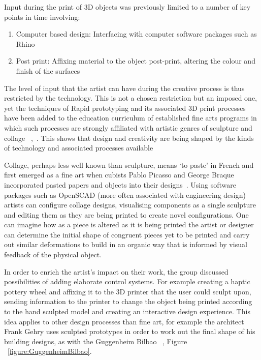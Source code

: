 \documentclass[pdftex, 11pt]{report} %
\begin{document}
	Input during the print of 3D objects was previously limited to a number of key points in time involving: 
\begin{enumerate}
\item Computer based design: Interfacing with computer software packages such as Rhino
\item Post print: Affixing material to the object post-print, altering the colour and finish of the surfaces
\end{enumerate}

	The level of input that the artist can have during the creative process is thus restricted by the technology. This is not a chosen restriction but an imposed one, yet the techniques of Rapid prototyping and its associated 3D print processes have been added to the education curriculum of established fine arts programs in which such processes are strongly affiliated with artistic genres of sculpture and collage ~\cite{Ganis2004},~\cite{Dawes2008}. This shows that design and creativity are being shaped by the kinds of technology and associated processes available 

	Collage, perhaps less well known than sculpture, means `to paste' in French and first emerged as a fine art when cubists Pablo Picasso and George Braque incorporated pasted papers and objects into their designs~\cite{Prudhoe2003}. Using software packages such as OpenSCAD (more often associated with engineering design) artists can configure collage designs, visualising components as a single sculpture and editing them as they are being printed to create novel configurations. One can imagine how as a piece is altered as it is being printed the artist or designer can determine the initial shape of congruent pieces yet to be printed and carry out similar deformations to build in an organic way that is informed by visual feedback of the physical object.

	In order to enrich the artist's impact on their work, the group discussed possibilities of adding elaborate control systems. For example creating a haptic pottery wheel and affixing it to the 3D printer that the user could sculpt upon, sending information to the printer to change the object being printed according to the hand sculpted model and creating an interactive design experience. This idea applies to other design processes than fine art, for example the architect Frank Gehry uses sculpted prototypes in order to work out the final shape of his building designs, as with the Guggenheim Bilbao ~\cite{Pollack2005}, Figure ~\ref{figure:GuggenheimBilbao}.
\end{document}
